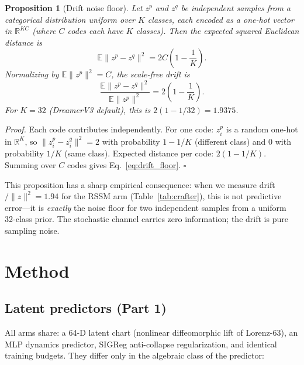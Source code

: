 \documentclass[preprint,12pt]{article}
\newtheorem{proposition}{Proposition}[section]
\begin{document}
\begin{proposition}[Drift noise floor]\label{prop:drift}
Let $z^p$ and $z^q$ be independent samples from a categorical distribution
uniform over $K$ classes, each encoded as a one-hot vector in
$\mathbb{R}^{KC}$ (where $C$ codes each have $K$ classes). Then the
expected squared Euclidean distance is
\begin{equation}\label{eq:drift_floor}
  \mathbb{E}\|z^p - z^q\|^2 = 2C\left(1 - \frac{1}{K}\right).
\end{equation}
Normalizing by $\mathbb{E}\|z^p\|^2 = C$, the scale-free drift is
\begin{equation}\label{eq:drift_norm_floor}
  \frac{\mathbb{E}\|z^p - z^q\|^2}{\mathbb{E}\|z^p\|^2}
  = 2\left(1 - \frac{1}{K}\right).
\end{equation}
For $K = 32$ (DreamerV3 default), this is $2(1 - 1/32) = 1.9375$.
\end{proposition}

\textit{Proof.} Each code contributes independently. For one code:
$z^p_i$ is a random one-hot in $\mathbb{R}^K$, so
$\|z^p_i - z^q_i\|^2 = 2$ with probability $1 - 1/K$ (different class)
and $0$ with probability $1/K$ (same class). Expected distance per code:
$2(1-1/K)$. Summing over $C$ codes gives Eq.~\eqref{eq:drift_floor}.
$\square$

This proposition has a sharp empirical consequence: when we measure
drift$/\|z\|^2 = 1.94$ for the RSSM arm (Table~\ref{tab:crafter}), this
is not predictive error---it is \emph{exactly} the noise floor for two
independent samples from a uniform 32-class prior. The stochastic channel
carries zero information; the drift is pure sampling noise.

\section{Method}

\subsection{Latent predictors (Part 1)}

All arms share: a 64-D latent chart (nonlinear diffeomorphic lift of
Lorenz-63), an MLP dynamics predictor, SIGReg anti-collapse regularization,
and identical training budgets. They differ only in the algebraic class of
the predictor:
\end{document}
